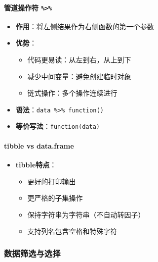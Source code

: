 \documentclass[
]{book}
\providecommand{\tightlist}{%
  \setlength{\itemsep}{0pt}\setlength{\parskip}{0pt}}
\begin{document}
\hypertarget{ux7ba1ux9053ux64cdux4f5cux7b26}{%
\paragraph{\texorpdfstring{管道操作符 \texttt{\%\textgreater{}\%}}{管道操作符 \%\textgreater\%}}\label{ux7ba1ux9053ux64cdux4f5cux7b26}}

\begin{itemize}
\tightlist
\item
  \textbf{作用}：将左侧结果作为右侧函数的第一个参数
\item
  \textbf{优势}：

  \begin{itemize}
  \tightlist
  \item
    代码更易读：从左到右，从上到下
  \item
    减少中间变量：避免创建临时对象
  \item
    链式操作：多个操作连续进行
  \end{itemize}
\item
  \textbf{语法}：\texttt{data\ \%\textgreater{}\%\ function()}
\item
  \textbf{等价写法}：\texttt{function(data)}
\end{itemize}

\hypertarget{tibble-vs-data.frame}{%
\paragraph{tibble vs data.frame}\label{tibble-vs-data.frame}}

\begin{itemize}
\tightlist
\item
  \textbf{tibble特点}：

  \begin{itemize}
  \tightlist
  \item
    更好的打印输出
  \item
    更严格的子集操作
  \item
    保持字符串为字符串（不自动转因子）
  \item
    支持列名包含空格和特殊字符
  \end{itemize}
\end{itemize}

\hypertarget{ux6570ux636eux7b5bux9009ux4e0eux9009ux62e9-1}{%
\subsubsection{数据筛选与选择}\label{ux6570ux636eux7b5bux9009ux4e0eux9009ux62e9-1}}
\end{document}
